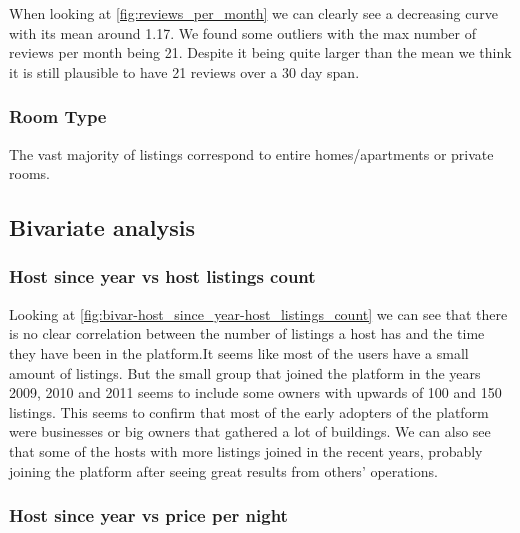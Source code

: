 

When looking at \ref{fig:reviews_per_month} we can clearly see a decreasing curve with its mean around 1.17. We found some outliers with the max number of reviews per month being 21. Despite it being quite larger than the mean we think it is still plausible to have 21 reviews over a 30 day span.


\pagebreak
\subsubsection{Room Type}


The vast majority of listings correspond to entire homes/apartments or private rooms.

\pagebreak
\subsection{Bivariate analysis}%
\subsubsection{Host since year vs host listings count}


Looking at \cref{fig:bivar-host_since_year-host_listings_count} we can see that there is no clear correlation between the number of listings a host has and the time they have been in the platform.It seems like most of the users have a small amount of listings. 
But the small group that joined the platform in the years 2009, 2010 and 2011 seems to include some owners with upwards of 100 and 150 listings. This seems to confirm that most of the early adopters of the platform were businesses or big owners that gathered a lot of buildings. We can also see that some of the hosts with more listings joined in the recent years, probably joining the platform after seeing great results from others' operations. 


\pagebreak
\subsubsection{Host since year vs price per night}

